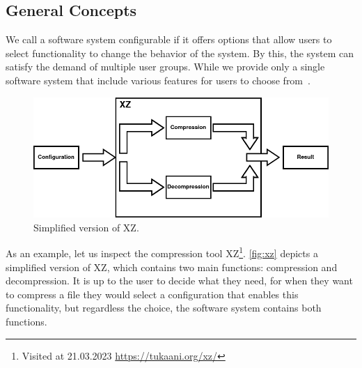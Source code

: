 \subsection{General Concepts}\label{ch:general-concepts}
We call a software system configurable if it offers options that allow users to select functionality to change the behavior of the system. %
By this, the system can satisfy the demand of multiple user groups. 
While we provide only a single software system that include various features for users to choose from~\cite{TooManyKnobs}.


\begin{figure}[h]
    \centering
    \includegraphics[scale=0.55]{gfx/ConfigurableSystemXZ.png}
    \caption{Simplified version of \textsc{XZ}.}
    \label{fig:xz}
\end{figure}

As an example, let us inspect the compression tool \textsc{XZ}\footnote{Visited at 21.03.2023 \url{https://tukaani.org/xz/}}.
\autoref{fig:xz} depicts a simplified version of \textsc{XZ}, which contains two main functions: compression and decompression. 
It is up to the user to decide what they need, for when they want to compress a file they would select a configuration that enables this functionality,
but regardless the choice, the software system contains both functions.
